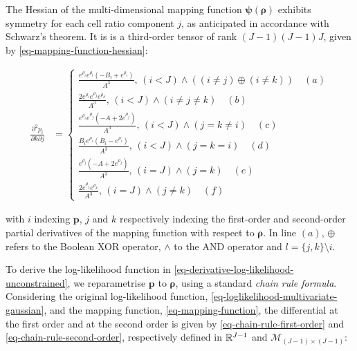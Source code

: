 \documentclass[pdflatex, sn-nature]{sn-jnl}
\theoremstyle{thmstyleone}%
\theoremstyle{thmstyletwo}%
\theoremstyle{thmstylethree}%
\begin{document}
\begin{appendices}
        The Hessian of the multi-dimensional mapping function $\boldsymbol{\psi}(\boldsymbol{\rho})$
        exhibits symmetry for each cell ratio component $j$, as anticipated in
        accordance with Schwarz's theorem. It is is a third-order tensor of rank
        $(J-1)(J-1)J$, given by \ref{eq-mapping-function-hessian}:

        \begin{equation}
            \label{eq-mapping-function-hessian}
            \begin{aligned}
                \frac{\partial^{2} p_{i}}{\partial k \partial j} & = \begin{cases}\frac{e^{\rho_i}e^{\rho_l}\left (-B_{i} + e^{\rho_i}\right)}{A^{3}},\, (i<J) \land \left((i\neq j) \oplus(i\neq k)\right) \quad (a)\\ \frac{2 e^{\rho_i}e^{\rho_j}e^{\rho_k}}{A^{3}}, \, (i<J) \land (i \neq j \neq k) \quad (b)\\ \frac{e^{\rho_i}e^{\rho_j}\left (-A + 2e^{\rho_j}\right)}{A^{3}}, \, (i<J) \land (j=k\neq i) \quad (c)\\ \frac{B_{i} e^{\rho_i}\left( B_{i} - e^{\rho_i}\right)}{A^{3}}, \, (i<J) \land (j = k = i) \quad (d)\\ \frac{e^{\rho_j}\left( -A + 2 e^{\rho_j}\right)}{A^{3}}, \, (i=J) \land (j = k) \quad (e)\\ \frac{2 e^{\rho_j}e^{\rho_k}}{A^{3}}, \, (i=J) \land (j \neq k) \quad (f)\end{cases}
            \end{aligned}
        \end{equation}

        with $i$ indexing $\boldsymbol{p}$, $j$ and $k$ respectively indexing
        the first-order and second-order partial derivatives of the mapping
        function with respect to $\boldsymbol{\rho}$. In line $(a)$, $\oplus$
        refers to the Boolean XOR operator, $\land$ to the AND operator and $l=\{
        j,k\} \setminus i$.

        To derive the log-likelihood function in \ref{eq-derivative-log-likelihood-unconstrained},
        we reparametrise $\boldsymbol{p}$ to $\boldsymbol{\rho}$, using a standard
        \textit{chain rule formula}. Considering the original log-likelihood function,
        \ref{eq-loglikelihood-multivariate-gaussian}, and the mapping function,
        \ref{eq-mapping-function}, the differential at the first order and at the
        second order is given by \ref{eq-chain-rule-first-order} and \ref{eq-chain-rule-second-order},
        respectively defined in $\mathbb{R}^{J-1}$ and $\mathcal{M}_{(J-1)\times(J-1)}$:


\end{appendices}
\end{document}
